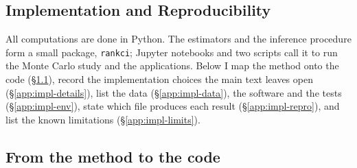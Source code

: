 \begin{appendix}

\chapter{Implementation and Reproducibility}
\label{app:implementation}

All computations are done in Python. The estimators and the inference procedure form a
small package, \texttt{rankci}; Jupyter notebooks and two scripts call it to run the
Monte Carlo study and the applications. Below I map the method onto the code
(\S\ref{app:impl-code}), record the implementation choices the main text leaves open
(\S\ref{app:impl-details}), list the data (\S\ref{app:impl-data}), the software and the
tests (\S\ref{app:impl-env}), state which file produces each result
(\S\ref{app:impl-repro}), and list the known limitations
(\S\ref{app:impl-limits}).

\section{From the method to the code}
\label{app:impl-code}


\end{appendix}
